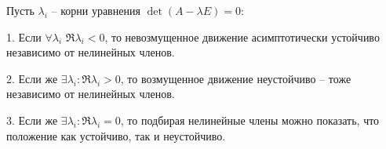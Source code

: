 \begin{to_thr}
	Пусть $\lambda_i$ -- корни уравнения $\det(A - \lambda E) = 0$:
	\begin{itemize*}
		\item[1.] Если $\forall \lambda_i$ $\Re \lambda_i < 0$, то невозмущенное движение асимптотически устойчиво независимо от нелинейных членов.
		\item[2.] Если же $\exists \lambda_i \colon  \Re \lambda_i >0$, то возмущенное движение неустойчиво -- тоже независимо от нелинейных членов. 
		\item[3.] Если же $\exists \lambda_i \colon  \Re \lambda_i = 0$, то подбирая нелинейные члены можно показать, что положение как устойчиво, так и неустойчиво.
	\end{itemize*}
\end{to_thr}

